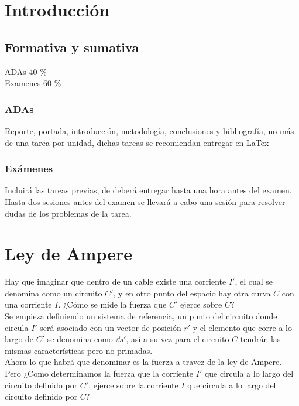 \documentclass[11pt]{report}
\theoremstyle{plain}
\theoremstyle{definition}
\begin{document}

\tableofcontents


\chapter{Introducción}
\section{Formativa y sumativa}
ADAs 40 \% \\
Examenes 60 \% \\


\subsection{ADAs}
Reporte, portada, introducción, metodología, conclusiones y bibliografía, no más de una tarea por unidad, dichas tareas se recomiendan entregar en LaTex

\subsection{Exámenes}
Incluirá las tareas previas, de deberá entregar hasta una hora antes del examen.\\
Hasta dos sesiones antes del examen se llevará a cabo una sesión para resolver dudas de los problemas de la tarea.



\chapter{Ley de Ampere}


Hay que imaginar que dentro de un cable existe una corriente $I'$, el cual se denomina como un circuito $C'$, y en otro punto del espacio hay otra curva $C$ con una corriente $I$. ¿Cómo se mide la fuerza que $C'$ ejerce sobre $C$?\\
Se empieza definiendo un sistema de referencia, un punto del circuito donde circula $I'$ será asociado con un vector de posición $r'$ y el elemento que corre a lo largo de $C'$ se denomina como $\dd{s'}$, así a su vez para el circuito $C$ tendrán las mismas características pero no primadas. \\
Ahora lo que habrá que denominar es la fuerza a travez de la ley de Ampere. Pero ¿Como determinamos la fuerza que la corriente $I'$ que circula a lo largo del circuito definido por $C'$, ejerce sobre la corriente $I$ que circula a lo largo del circuito definido por $C$?\\
\end{document}
